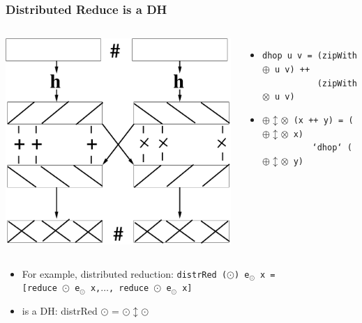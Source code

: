 \documentclass{beamer}
\begin{document}
\begin{frame}[fragile,t]
  \frametitle{Distributed Reduce is a DH}

\begin{columns}
\includegraphics[height=25ex]{Figures/DH}
\vspace{-3ex}
\begin{itemize}
    \item {\tt dhop u v = (zipWith $\oplus$ u v) ++}\\ 
          {\tt~~~~~~~~~~~(zipWith $\otimes$ u v)}
    \item {\tt $\oplus\updownarrow\otimes$ (x ++ y) = ($\oplus\updownarrow\otimes$ x)}\\
          {\tt~~~~~~~~~~`dhop` ($\oplus\updownarrow\otimes$ y)} 
\end{itemize}
\end{columns}

\begin{itemize}
    \item For example, distributed reduction: 
        {\tt distrRed ($\odot$) e$_\odot$ x = }\\
        {\tt [reduce $\odot$ e$_{\odot}$ x,$\ldots$, reduce $\odot$ e$_{\odot}$ x]}
    \item is a DH: distrRed $\odot$ = $\odot\updownarrow\odot$
\end{itemize}

\end{frame}
\end{document}
